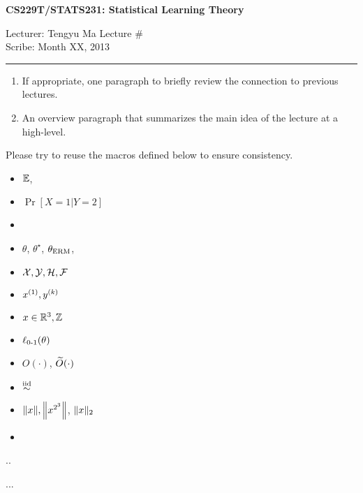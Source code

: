 \newpage
{}
\draftnotice

\begin{center}
	\bf\large CS229T/STATS231: Statistical Learning Theory
\end{center}

\noindent
Lecturer: Tengyu Ma   %
\hfill
Lecture \#               %
\\
Scribe:                  %
\hfill
Month XX, 2013           %

\noindent
\rule{\textwidth}{1pt}

\medskip


\begin{enumerate}
	\item If appropriate, one paragraph to briefly review the connection to previous lectures.
	\item An overview paragraph that summarizes the main idea of the lecture at a high-level. 
\end{enumerate}  
Please try to reuse the macros defined below to ensure consistency.
\begin{itemize}
	\item $\Exp$, 
	\item $\Pr[X=1\vert Y=2]$
	\item 
	\item 
	$\theta$, $\theta^\star$, $\thetaerm$, 
	\item 
	$\cX,\cY, \cH, \cF$
	\item $x\sp{1}, y\sp{k}$
	\item 
	$x\in \R^3, \bbZ$
	\item $\err(\theta)$
	\item $O(\cdot)$, $\tilO(\cdot)$
	\item $\iid$
	\item $\norm{x}, \Norm{x^{2^3}}$, $\norm{x}_{2}$
	\item 
\end{itemize}
\begin{theorem}
	..
\end{theorem}
\begin{lemma}
	...
\end{lemma}


	
\lipsum
